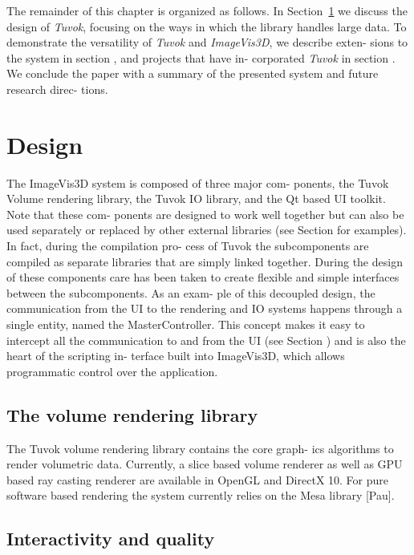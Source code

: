 The remainder of this chapter is organized as follows. In
Section~\ref{sec:design} we discuss the design of \textit{Tuvok},
focusing on the ways in which the library handles large data. To
demonstrate
the versatility of \textit{Tuvok} and \textit{ImageVis3D}, we describe exten-
sions to the system in section , and projects that have in-
corporated \textit{Tuvok} in section . We conclude the paper with a
summary of the presented system and future research direc-
tions.

\section{Design}
\label{sec:design}

The ImageVis3D system is composed of three major com-
ponents, the Tuvok Volume rendering library, the Tuvok IO
library, and the Qt based UI toolkit. Note that these com-
ponents are designed to work well together but can also be
used separately or replaced by other external libraries (see
Section  for examples). In fact, during the compilation pro-
cess of Tuvok the subcomponents are compiled as separate
libraries that are simply linked together. During the design of
these components care has been taken to create flexible and
simple interfaces between the subcomponents. As an exam-
ple of this decoupled design, the communication from the
UI to the rendering and IO systems happens through a single
entity, named the MasterController. This concept makes
it easy to intercept all the communication to and from the
UI (see Section ) and is also the heart of the scripting in-
terface built into ImageVis3D, which allows programmatic
control over the application.

\subsection{The volume rendering library}

The Tuvok volume rendering library contains the core graph-
ics algorithms to render volumetric data. Currently, a slice
based volume renderer as well as GPU based ray casting
renderer are available in OpenGL and DirectX 10. For pure
software based rendering the system currently relies on the
Mesa library [Pau].

\subsection{Interactivity and quality}

